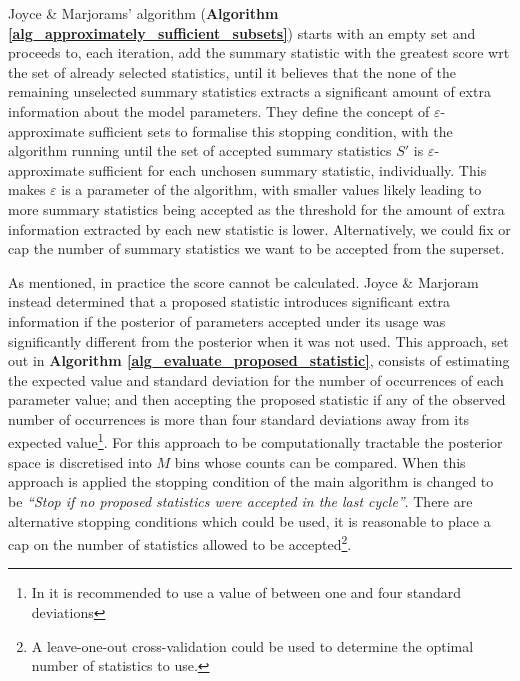 \documentclass[bibliography=totoc,11pt,a4paper,margin=0]{article}
\theoremstyle{break}
\begin{document}
  \par Joyce \& Marjorams' algorithm (\textbf{Algorithm \ref{alg_approximately_sufficient_subsets}}) starts with an empty set and proceeds to, each iteration, add the summary statistic with the greatest score wrt the set of already selected statistics, until it believes that the none of the remaining unselected summary statistics extracts a significant amount of extra information about the model parameters. They define the concept of $\varepsilon$-approximate sufficient sets to formalise this stopping condition, with the algorithm running until the set of accepted summary statistics $S'$ is $\varepsilon$-approximate sufficient for each unchosen summary statistic, individually. This makes $\varepsilon$ is a parameter of the algorithm, with smaller values likely leading to more summary statistics being accepted as the threshold for the amount of extra information extracted by each new statistic is lower. Alternatively, we could fix or cap the number of summary statistics we want to be accepted from the superset.

  \par As mentioned, in practice the score cannot be calculated. Joyce \& Marjoram instead determined that a proposed statistic introduces significant extra information if the posterior of parameters accepted under its usage was significantly different from the posterior when it was not used. This approach, set out in \textbf{Algorithm \ref{alg_evaluate_proposed_statistic}}, consists of estimating the expected value and standard deviation for the number of occurrences of each parameter value; and then accepting the proposed statistic if any of the observed number of occurrences is more than four standard deviations away from its expected value\footnote{In \cite[]{Approximately_sufficient_statistics_and_bayesian_computation} it is recommended to use a value of between one and four standard deviations}. For this approach to be computationally tractable the posterior space is discretised into $M$ bins whose counts can be compared. When this approach is applied the stopping condition of the main algorithm is changed to be \textit{``Stop if no proposed statistics were accepted in the last cycle''}. There are alternative stopping conditions which could be used, it is reasonable to place a cap on the number of statistics allowed to be accepted\footnote{A leave-one-out cross-validation could be used to determine the optimal number of statistics to use.}.
\end{document}

